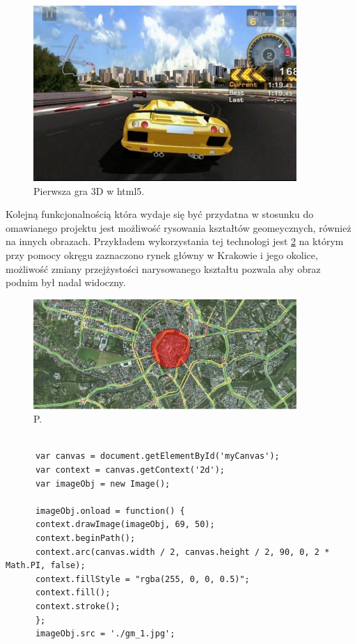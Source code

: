\begin{figure}[H]
  \centering
    \includegraphics[width=100mm]{ge/html5_3d.jpg}
  \caption{Pierwsza gra 3D w html5.}
  \label{fig:html3d}
\end{figure}

Kolejną funkcjonalnością która wydaje się być przydatna w stosunku do omawianego projektu jest możliwość rysowania kształtów geomeycznych, również na innych obrazach. Przykładem wykorzystania tej technologi jest \ref{fig:canvas1} na którym przy pomocy okręgu zaznaczono rynek główny w Krakowie i jego okolice, możliwość zmiany przejżystości narysowanego kształtu pozwala aby obraz podnim był nadal widoczny.

  \begin{figure}[H]
  \centering
    \includegraphics[width=100mm]{ge/canvas1.jpg}
  \caption{P.}
  \label{fig:canvas1}
\end{figure}

\lstset{language=JavaScript}
\begin{lstlisting}[caption=json]

      var canvas = document.getElementById('myCanvas');
      var context = canvas.getContext('2d');
      var imageObj = new Image();
	
      imageObj.onload = function() {
      context.drawImage(imageObj, 69, 50);
	  context.beginPath();
      context.arc(canvas.width / 2, canvas.height / 2, 90, 0, 2 * Math.PI, false);
      context.fillStyle = "rgba(255, 0, 0, 0.5)";
      context.fill();
      context.stroke();
      };
      imageObj.src = './gm_1.jpg';

\end{lstlisting}

